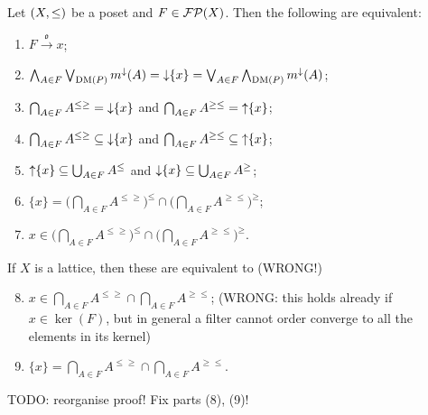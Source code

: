 \begin{proposition} \label{orderConvergenceEquivalents}
Let $\sSet{X,\leq}$ be a poset and $F\in\operatorname{\mathcal{FP}}(X)$. Then
the following are equivalent:
\begin{enumerate}
\item $F\overset{\mathfrak{o}}{\longrightarrow} x$;
\item $\bigwedge_{A\in F}\bigvee_{\operatorname{DM}(P)} m^\downarrow(A) = \operatorname{\downarrow}\{x\} = \bigvee_{A\in F}\bigwedge_{\operatorname{DM}(P)} m^\downarrow(A)$;
\item $\bigcap_{A\in F}A^{\leq \geq} = \operatorname{\downarrow} \{x\}$ and $\bigcap_{A\in F}A^{\geq\leq} = \operatorname{\uparrow}\{x\}$;
\item $\bigcap_{A\in F}A^{\leq \geq} \subseteq \operatorname{\downarrow} \{x\}$ and $\bigcap_{A\in F}A^{\geq\leq} \subseteq \operatorname{\uparrow}\{x\}$;
\item $\operatorname{\uparrow}\{x\} \subseteq \bigcup_{A\in F}A^{\leq}$ and $\operatorname{\downarrow}\{x\} \subseteq \bigcup_{A\in F}A^{\geq}$;
\item $\{x\} = \Big(\bigcap_{A\in F}A^{\leq \geq}\Big)^\leq \cap \Big(\bigcap_{A\in F}A^{\geq\leq}\Big)^\geq$;
\item $x\in \Big(\bigcap_{A\in F}A^{\leq \geq}\Big)^\leq \cap \Big(\bigcap_{A\in F}A^{\geq\leq}\Big)^\geq$.
\end{enumerate}
If $X$ is a lattice, then these are equivalent to (WRONG!)
\begin{enumerate} \setcounter{enumi}{7}
\item $x\in \bigcap_{A\in F}A^{\leq \geq} \cap \bigcap_{A\in F}A^{\geq\leq}$; (WRONG: this holds already if $x\in \ker(F)$, but in general a filter cannot order converge to all the elements in its kernel)
\item $\{x\} = \bigcap_{A\in F}A^{\leq \geq} \cap \bigcap_{A\in F}A^{\geq\leq}$.
\end{enumerate}
\end{proposition}
TODO: reorganise proof! Fix parts (8), (9)!
